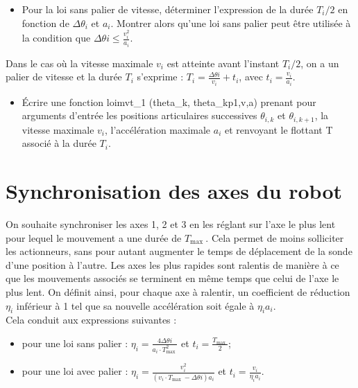 \begin{itemize}
  \item[Q38.] Pour la loi sans palier de vitesse, déterminer l'expression de la durée $T_{i} / 2$ en fonction de $\Delta \theta_{i}$ et $a_{i}$. Montrer alors qu'une loi sans palier peut être utilisée à la condition que $\Delta \theta i \leq \frac{v_{i}^{2}}{a_{i}}$.
\end{itemize}

Dans le cas où la vitesse maximale $v_{i}$ est atteinte avant l'instant $T_{i} / 2$, on a un palier de vitesse et la durée $T_{i}$ s'exprime : $T_{i}=\frac{\Delta \theta i}{v_{i}}+t_{i}$, avec $t_{i}=\frac{v_{i}}{a_{i}}$.

\begin{itemize}
  \item[Q39.] Écrire une fonction loimvt\_1 (theta\_k, theta\_kp1,v,a) prenant pour arguments d'entrée les positions articulaires successives $\theta_{i, k}$ et $\theta_{i, k+1}$, la vitesse maximale $v_{i}$, l'accélération maximale $a_{i}$ et renvoyant le flottant T associé à la durée $T_{i}$.
\end{itemize}

\section*{Synchronisation des axes du robot}
On souhaite synchroniser les axes 1, 2 et 3 en les réglant sur l'axe le plus lent pour lequel le mouvement a une durée de $T_{\text {max }}$. Cela permet de moins solliciter les actionneurs, sans pour autant augmenter le temps de déplacement de la sonde d'une position à l'autre. Les axes les plus rapides sont ralentis de manière à ce que les mouvements associés se terminent en même temps que celui de l'axe le plus lent. On définit ainsi, pour chaque axe à ralentir, un coefficient de réduction $\eta_{i}$ inférieur à 1 tel que sa nouvelle accélération soit égale à $\eta_{i} a_{i}$.\\
Cela conduit aux expressions suivantes :

\begin{itemize}
  \item[-] pour une loi sans palier : $\eta_{i}=\frac{4 \Delta \theta i}{a_{i} \cdot T_{\text {max }}^{2}}$ et $t_{i}=\frac{T_{\text {max }}}{2}$;
  \item[-] pour une loi avec palier : $\eta_{i}=\frac{v_{i}^{2}}{\left(v_{i} \cdot T_{\text {max }}-\Delta \theta i\right) a_{i}}$ et $t_{i}=\frac{v_{i}}{\eta_{i} a_{i}}$.
\end{itemize}

